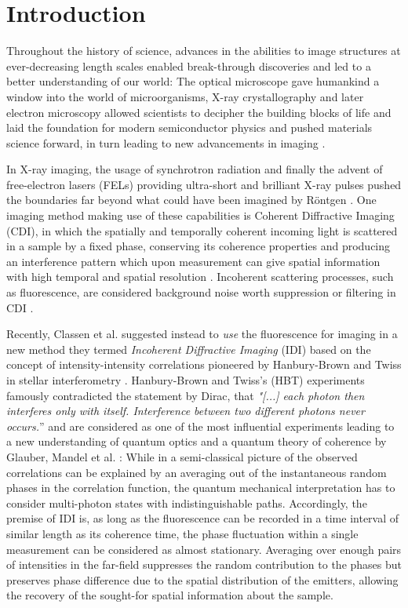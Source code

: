 \chapter{Introduction}
Throughout the history of science, advances in the abilities to image structures at ever-decreasing length scales enabled break-through discoveries and led to a better understanding of our world:
The optical microscope gave humankind a window into the world of microorganisms, X-ray crystallography and later electron microscopy allowed scientists to decipher the building blocks of life and laid the foundation for modern semiconductor physics and pushed materials science forward, in turn leading to new advancements in imaging \cite{hooke1665,laue1915,ruska1939,watson1953,hovmoeller1984}.

In X-ray imaging, the usage of synchrotron radiation and finally the advent of free-electron lasers (FELs) providing ultra-short and brilliant X-ray pulses pushed the boundaries far beyond what could have been imagined by Röntgen \cite{cloetens1996,emma2010}. One imaging method making use of these capabilities is Coherent Diffractive Imaging (CDI), in which the spatially and temporally coherent incoming light is scattered in a sample by a fixed phase, conserving its coherence properties and producing an interference pattern which upon measurement can give spatial information with high temporal and spatial resolution \cite{seibert2011,bostedt2010,barke2015}. Incoherent scattering processes, such as fluorescence, are considered background noise worth suppression or filtering in CDI \cite{schultz2013chapter7}. 

Recently, Classen et al. suggested instead to \textit{use} the fluorescence for imaging in a new method they termed \textit{Incoherent Diffractive Imaging} (IDI) based on the concept of intensity-intensity correlations pioneered by Hanbury-Brown and Twiss in stellar interferometry \cite{classen2017,hanbury1956}.  Hanbury-Brown and Twiss's (HBT) experiments famously contradicted the statement by Dirac, that \textit{"[...] each photon then interferes only with itself. Interference between two different photons never occurs.}” \cite{dirac1958} and are considered as one of the most influential experiments leading to a new understanding of quantum optics and a quantum theory of coherence by Glauber, Mandel et al. \cite{glauber1963,mandel1959, hong1987,glauber2006}: While in a semi-classical picture of the observed correlations can be explained by an averaging out of the instantaneous random phases in the correlation function, the quantum mechanical interpretation has to consider multi-photon states with indistinguishable paths. Accordingly, the premise of IDI is, as long as the fluorescence can be recorded in a time interval of similar length as its coherence time, the phase fluctuation within a single measurement can be considered as almost stationary. Averaging over enough pairs of intensities in the far-field suppresses the random contribution to the phases but preserves phase difference due to the spatial distribution of the emitters, allowing the recovery of the sought-for spatial information about the sample.

